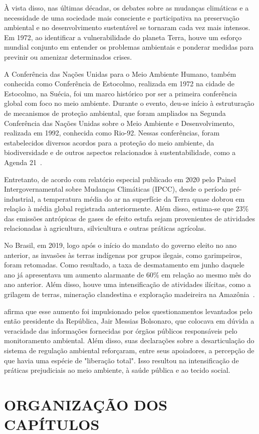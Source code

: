     À vista disso, nas últimas décadas, os debates sobre as mudanças climáticas e a necessidade de uma sociedade 
    mais consciente e participativa na preservação ambiental e no desenvolvimento sustentável se tornaram cada 
    vez mais intensos. Em 1972, ao identificar a vulnerabilidade do planeta Terra, houve um esforço mundial conjunto
    em entender os problemas ambientais e ponderar medidas para previnir ou amenizar determinados crises.
    
    A Conferência das Nações Unidas para o Meio Ambiente Humano, também conhecida como Conferência de Estocolmo, 
    realizada em 1972 na cidade de Estocolmo, na Suécia, foi um marco histórico por ser a primeira conferência 
    global com foco no meio ambiente. Durante o evento, deu-se início à estruturação de mecanismos de proteção 
    ambiental, que foram ampliados na Segunda Conferência das Nações Unidas sobre o Meio Ambiente e 
    Desenvolvimento, realizada em 1992, conhecida como Rio-92. Nessas conferências, foram estabelecidos 
    diversos acordos para a proteção do meio ambiente, da biodiversidade e de outros aspectos relacionados à 
    sustentabilidade, como a Agenda 21~\cite{passos2009}.


    Entretanto, de acordo com relatório especial publicado em 2020 pelo Painel Intergovernamental sobre Mudanças Climáticas (IPCC), 
    desde o período pré-industrial, a temperatura média do ar na superfície da Terra quase dobrou em relação à média 
    global registrada anteriormente. Além disso, estima-se que 23\% das emissões antrópicas de gases de efeito estufa 
    sejam provenientes de atividades relacionadas à agricultura, silvicultura e outras práticas agrícolas.

    No Brasil, em 2019, logo após o início do mandato do governo eleito no ano anterior, as invasões às terras 
    indígenas por grupos ilegais, como garimpeiros, foram retomadas. Como resultado, a taxa de desmatamento em 
    junho daquele ano já apresentava um aumento alarmante de 60\% em relação ao mesmo mês do ano anterior. 
    Além disso, houve uma intensificação de atividades ilícitas, como a grilagem de terras, mineração clandestina 
    e exploração madeireira na Amazônia~\cite{barretto2020}.

     afirma que esse aumento foi impulsionado pelos questionamentos levantados pelo então 
    presidente da República, Jair Messias Bolsonaro, que colocava em dúvida a veracidade das informações fornecidas 
    por órgãos públicos responsáveis pelo monitoramento ambiental. Além disso, suas declarações sobre a desarticulação do sistema de 
    regulação ambiental reforçaram, entre seus apoiadores, a percepção de que havia uma espécie de "liberação total".
    Isso resultou na intensificação de práticas prejudiciais ao meio ambiente, à saúde pública e ao tecido social.



\section{ORGANIZAÇÃO DOS CAPÍTULOS}
